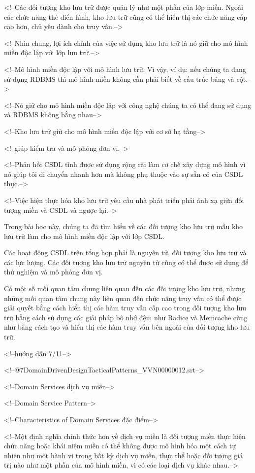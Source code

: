 <!--Các đối tượng kho lưu trữ được quản lý như một phần của lớp miền. Ngoài các chức năng thẻ điển hình, kho lưu trữ cũng có thể hiển thị các chức năng cấp cao hơn, chủ yếu dành cho truy vấn.-->

<!--Nhìn chung, lợi ích chính của việc sử dụng kho lưu trữ là nó giữ cho mô hình miền độc lập với lớp lưu trữ.-->

<!--Mô hình miền độc lập với mô hình lưu trữ. Vì vậy, ví dụ: nếu chúng ta đang sử dụng RDBMS thì mô hình miền không cần phải biết về cấu trúc bảng và cột.-->

<!--Nó giữ cho mô hình miền độc lập với công nghệ chúng ta có thể đang sử dụng và RDBMS không bằng nhau-->

<!--Kho lưu trữ giữ cho mô hình miền độc lập với cơ sở hạ tầng-->

<!--giúp kiểm tra và mô phỏng đơn vị.-->

<!--Phản hồi CSDL tĩnh được sử dụng rộng rãi làm cơ chế xây dựng mô hình vì nó giúp tôi di chuyển nhanh hơn mà không phụ thuộc vào sự sẵn có của CSDL thực.-->

<!--Việc hiện thực hóa kho lưu trữ yêu cầu nhà phát triển phải ánh xạ giữa đối tượng miền và CSDL và ngược lại.-->

Trong bài học này, chúng ta đã tìm hiểu về các đối tượng kho lưu trữ mẫu kho lưu trữ làm cho mô hình miền độc lập với lớp CSDL.

Các hoạt động CSDL trên tổng hợp phải là nguyên tử, đối tượng kho lưu trữ và các lực lượng. Các đối tượng kho lưu trữ nguyên tử cũng có thể được sử dụng để thử nghiệm và mô phỏng đơn vị.

Có một số mối quan tâm chung liên quan đến các đối tượng kho lưu trữ, nhưng những mối quan tâm chung này liên quan đến chức năng truy vấn có thể được giải quyết bằng cách hiển thị các hàm truy vấn cấp cao trong đối tượng kho lưu trữ bằng cách sử dụng các giải pháp bộ nhớ đệm như Radice và Memcache cũng như bằng cách tạo và hiển thị các hàm truy vấn bên ngoài của đối tượng kho lưu trữ.

<!--hướng dẫn 7/11-->

<!--@\07DomainDrivenDesignTacticalPatterns_VVN\000000012.srt-->

<!--Domain Services dịch vụ miền-->

<!--Domain Service Pattern-->

<!--Characteristics of Domain Services đặc điểm-->

<!--Một định nghĩa chính thức hơn về dịch vụ miền là đối tượng miền thực hiện chức năng hoặc khái niệm miền có thể không được mô hình hóa một cách tự nhiên như một hành vi trong bất kỳ dịch vụ miền, thực thể hoặc đối tượng giá trị nào như một phần của mô hình miền, vì có các loại dịch vụ khác nhau.-->

